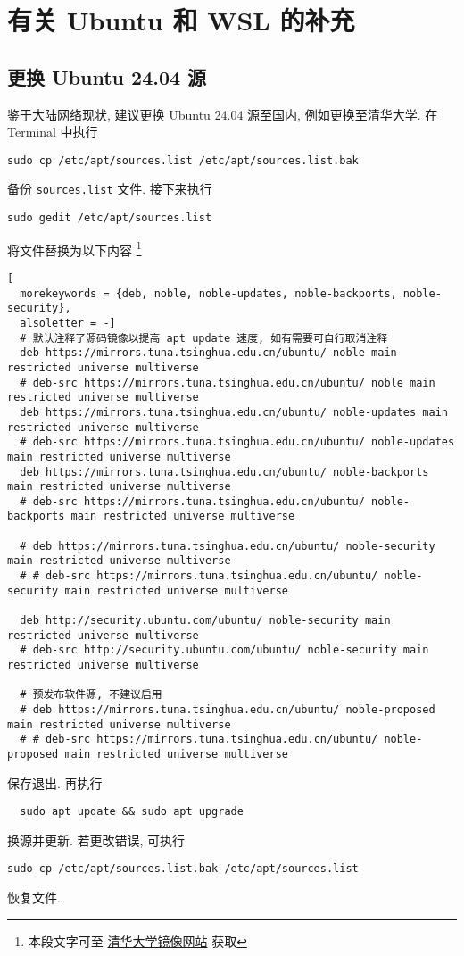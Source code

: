 
\chapter{有关 Ubuntu 和 WSL 的补充}\label{chp:appendix:addition}

\section{更换 Ubuntu 24.04 源}\label{sec:addition:source}

鉴于大陆网络现状,
建议更换 Ubuntu 24.04 源至国内,
例如更换至清华大学.
在 \textsf{Terminal} 中执行
\begin{lstlisting}[deletekeywords = apt]
  sudo cp /etc/apt/sources.list /etc/apt/sources.list.bak
\end{lstlisting}
备份 \texttt{sources.list} 文件.
接下来执行
\begin{lstlisting}[deletekeywords = apt]
  sudo gedit /etc/apt/sources.list
\end{lstlisting}
将文件替换为以下内容%
\footnote{本段文字可至%
\href{https://mirrors.tuna.tsinghua.edu.cn/help/ubuntu/}{清华大学镜像网站}%
获取}
\begin{lstlisting}[
  morekeywords = {deb, noble, noble-updates, noble-backports, noble-security},
  alsoletter = -]
  # 默认注释了源码镜像以提高 apt update 速度, 如有需要可自行取消注释
  deb https://mirrors.tuna.tsinghua.edu.cn/ubuntu/ noble main restricted universe multiverse
  # deb-src https://mirrors.tuna.tsinghua.edu.cn/ubuntu/ noble main restricted universe multiverse
  deb https://mirrors.tuna.tsinghua.edu.cn/ubuntu/ noble-updates main restricted universe multiverse
  # deb-src https://mirrors.tuna.tsinghua.edu.cn/ubuntu/ noble-updates main restricted universe multiverse
  deb https://mirrors.tuna.tsinghua.edu.cn/ubuntu/ noble-backports main restricted universe multiverse
  # deb-src https://mirrors.tuna.tsinghua.edu.cn/ubuntu/ noble-backports main restricted universe multiverse

  # deb https://mirrors.tuna.tsinghua.edu.cn/ubuntu/ noble-security main restricted universe multiverse
  # # deb-src https://mirrors.tuna.tsinghua.edu.cn/ubuntu/ noble-security main restricted universe multiverse

  deb http://security.ubuntu.com/ubuntu/ noble-security main restricted universe multiverse
  # deb-src http://security.ubuntu.com/ubuntu/ noble-security main restricted universe multiverse

  # 预发布软件源, 不建议启用
  # deb https://mirrors.tuna.tsinghua.edu.cn/ubuntu/ noble-proposed main restricted universe multiverse
  # # deb-src https://mirrors.tuna.tsinghua.edu.cn/ubuntu/ noble-proposed main restricted universe multiverse
\end{lstlisting}
保存退出.
再执行
\begin{lstlisting}
  sudo apt update && sudo apt upgrade
\end{lstlisting}
换源并更新.
若更改错误,
可执行
\begin{lstlisting}[deletekeywords = apt]
  sudo cp /etc/apt/sources.list.bak /etc/apt/sources.list
\end{lstlisting}
恢复文件.

